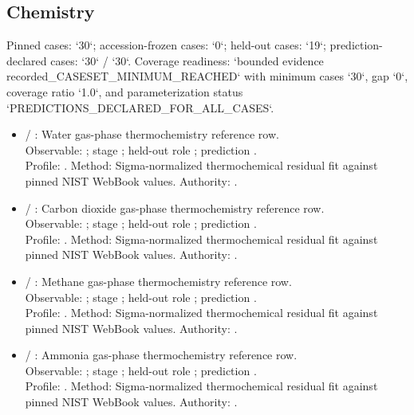 \subsection{Chemistry}
Pinned cases: `30`; accession-frozen cases: `0`; held-out cases: `19`; prediction-declared cases: `30` / `30`.
Coverage readiness: `bounded evidence recorded\_CASESET\_MINIMUM\_REACHED` with minimum cases `30`, gap `0`, coverage ratio `1.0`, and parameterization status `PREDICTIONS\_DECLARED\_FOR\_ALL\_CASES`.
\begin{itemize}
\item {} / : Water gas-phase thermochemistry reference row.\\ Observable: ; stage ; held-out role ; prediction .\\ Profile: . Method: Sigma-normalized thermochemical residual fit against pinned NIST WebBook values. Authority: .
\item {} / : Carbon dioxide gas-phase thermochemistry reference row.\\ Observable: ; stage ; held-out role ; prediction .\\ Profile: . Method: Sigma-normalized thermochemical residual fit against pinned NIST WebBook values. Authority: .
\item {} / : Methane gas-phase thermochemistry reference row.\\ Observable: ; stage ; held-out role ; prediction .\\ Profile: . Method: Sigma-normalized thermochemical residual fit against pinned NIST WebBook values. Authority: .
\item {} / : Ammonia gas-phase thermochemistry reference row.\\ Observable: ; stage ; held-out role ; prediction .\\ Profile: . Method: Sigma-normalized thermochemical residual fit against pinned NIST WebBook values. Authority: .

\end{itemize}
